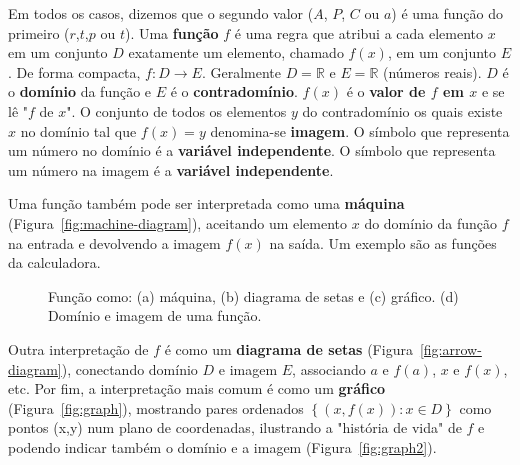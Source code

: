 Em todos os casos, dizemos que o segundo valor ($A$, $P$, $C$ ou $a$) é uma função do primeiro ($r$,$t$,$p$ ou $t$). Uma \textbf{função} $f$ é uma regra que atribui a cada elemento $x$ em um conjunto $D$ exatamente um elemento, chamado $f(x)$, em um conjunto $E$. De forma compacta, $f:D\rightarrow E$. Geralmente $D=\mathds{R}$ e $E=\mathds{R}$ (números reais). $D$ é o \textbf{domínio} da função e $E$ é o \textbf{contradomínio}. $f(x)$ é o \textbf{valor de $f$ em $x$} e se lê "$f$ de $x$". O conjunto de todos os elementos $y$ do contradomínio os quais existe $x$ no domínio tal que $f(x)=y$ denomina-se \textbf{imagem}. O símbolo que representa um número no domínio é a \textbf{variável independente}. O símbolo que representa um número na imagem é a \textbf{variável independente}.

Uma função também pode ser interpretada como uma \textbf{máquina} (Figura~\ref{fig:machine-diagram}), aceitando um elemento $x$ do domínio da função $f$ na entrada e devolvendo a imagem $f(x)$ na saída. Um exemplo são as funções da calculadora.
\begin{figure}[!ht]
  \centering
  \vspace{-0.3cm}
  \begin{minipage}[b]{0.3\columnwidth}
    \centering
    \vfill
  \end{minipage}
  \usebox{\measurebox}\qquad
  \caption{Função como: (a) máquina, (b) diagrama de setas e (c) gráfico. (d) Domínio e imagem de uma função.}
\end{figure}

Outra interpretação de $f$ é como um \textbf{diagrama de setas} (Figura~\ref{fig:arrow-diagram}), conectando domínio $D$ e imagem $E$, associando $a$ e $f(a)$, $x$ e $f(x)$, etc. Por fim, a interpretação mais comum é como um \textbf{gráfico} (Figura~\ref{fig:graph}), mostrando pares ordenados $\left\{(x,f(x)):x\in D\right\}$ como pontos (x,y) num plano de coordenadas, ilustrando a "história de vida" de $f$ e podendo indicar também o domínio e a imagem (Figura~\ref{fig:graph2}).

